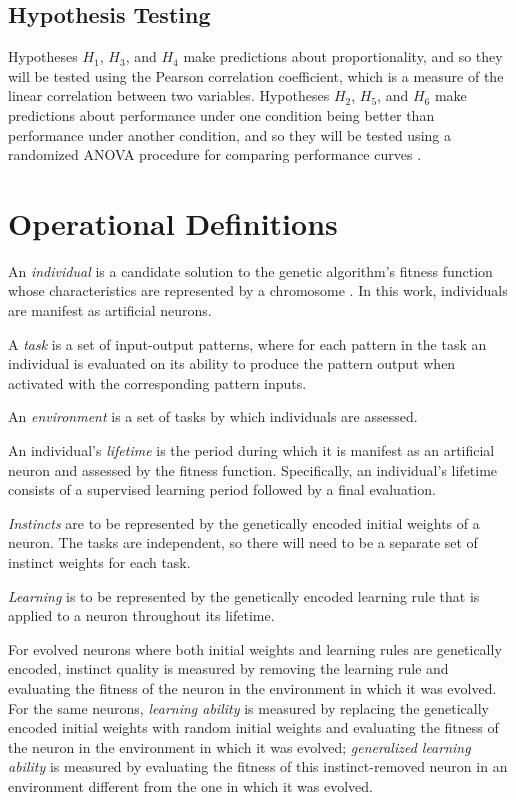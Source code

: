 \documentclass[master]{outhesis}
\begin{document}
\section{Hypothesis Testing}

Hypotheses $H_1$, $H_3$, and $H_4$ make predictions about proportionality, 
and so they will be tested using the Pearson correlation coefficient,
which is a measure of the linear correlation between two variables.
Hypotheses $H_2$, $H_5$, and $H_6$ make predictions about performance under one condition being better than performance under another condition,
and so they will be tested using a randomized ANOVA procedure for comparing performance curves \cite{Piater:1998aa}.

\chapter{Operational Definitions}

An \emph{individual} is a candidate solution to the genetic algorithm's fitness function whose characteristics are represented by a chromosome \cite{Engelbrecht:2007aa}. In this work, individuals are manifest as artificial neurons. 

A \emph{task} is a set of input-output patterns,
where for each pattern in the task an individual is evaluated on its ability to produce the pattern output when activated with the corresponding pattern inputs.

An \emph{environment} is a set of tasks by which individuals are assessed.

An individual's \emph{lifetime} is the period during which it is manifest as an artificial neuron and assessed by the fitness function. Specifically, an individual's lifetime consists of a supervised learning period followed by a final evaluation.

\emph{Instincts} are to be represented by the genetically encoded initial weights of a neuron. The tasks are independent, so there will need to be a separate set of instinct weights for each task.

\emph{Learning} is to be represented by the genetically encoded learning rule that is applied to a neuron throughout its lifetime.

For evolved neurons where both initial weights and learning rules are genetically encoded, instinct quality is measured by removing the learning rule and evaluating the fitness of the neuron in the environment in which it was evolved.
For the same neurons, \emph{learning ability} is measured by replacing the genetically encoded initial weights with random initial weights and evaluating the fitness of the neuron in the environment in which it was evolved; \emph{generalized learning ability} is measured by evaluating the fitness of this instinct-removed neuron in an environment different from the one in which it was evolved.
\end{document}
